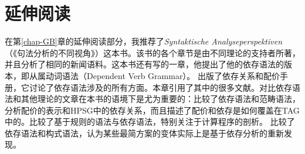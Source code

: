 \section*{延伸阅读}
%
在第\ref{chap-GB}章的延伸阅读部分，我推荐了\emph{Syntaktische Analyseperspektiven}（《句法分析的不同视角》）这本书。该书的各个章节是由不同理论的支持者所著，并且分析了相同的新闻语料。这本书还有\citet{Engel2014a}写的一章，他提出了他的依存语法的版本，即从属动词语法（Dependent Verb Grammar）。
%
\citet*{AEEHHL2003a-ed-not-crossreferenced,AEEHHL2006a-ed-not-crossreferenced}出版了依存关系和配价手册，它讨论了依存语法涉及的所有方面。本章引用了其中的很多文献。对比依存语法和其他理论的文章在本书的语境下是尤为重要的：\citet{Lobin2003a}比较了依存语法和范畴语法，\citet{Oliva2003a}分析配价的表示和HPSG中的依存关系，而且\citet*{BJR2003a-u}描述了配价和依存是如何覆盖在TAG中的。\citet{Hellwig2006a}比较了基于规则的语法与依存语法，特别关注于计算程序的剖析。
%
\citet{OG2012a-u}比较了依存语法和构式语法，\citet*{OPG2011a}认为某些最简方案的变体实际上是基于依存分析的重新发现。

